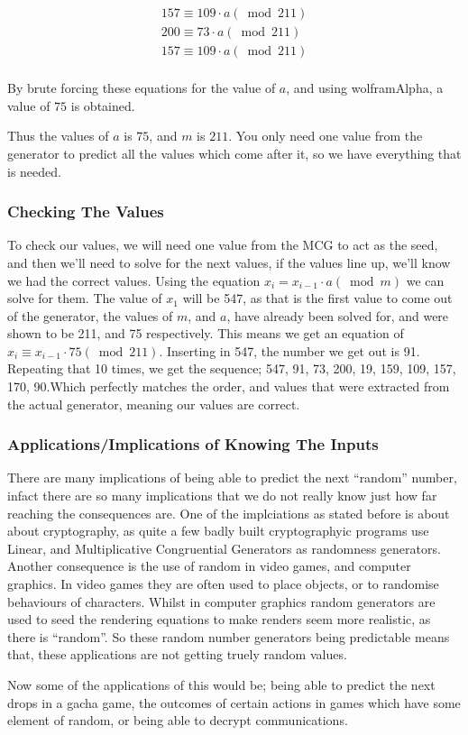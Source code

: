 \documentclass[12pft, english]{article}
\begin{document}
\begin{multicols}{2}
  \begin{gather*}
      157 \equiv 109 \cdot a (\bmod 211) \\
      200 \equiv 73 \cdot a (\bmod 211)  \\
      157 \equiv 109 \cdot a (\bmod 211) \\
    \end{gather*}

    By brute forcing these equations for the value of \(a\), and using wolframAlpha, a value of \(75\) is obtained.

    Thus the values of \(a\) is \(75\), and \(m\) is \(211\). You only need one value from the generator to predict all the values which come after it, so we have everything that is needed.

    \subsubsection{Checking The Values}
    To check our values, we will need one value from the MCG to act as the seed, and then we'll need to solve for the next values, if the values line up, we'll know we had the correct values. Using the equation \(x_{i} = x_{i-1} \cdot a (\bmod m)\) we can solve for them. The value of \(x_{1}\) will be 547, as that is the first value to come out of the generator, the values of \(m\), and \(a\), have already been solved for, and were shown to be 211, and 75 respectively. This means we get an equation of \( x_{i} \equiv x_{i-1} \cdot 75 (\bmod 211)\). Inserting in 547, the number we get out is 91. Repeating that 10 times, we get the sequence; 547, 91, 73, 200, 19, 159, 109, 157, 170, 90.Which perfectly matches the order, and values that were extracted from the actual generator, meaning our values are correct.

    \subsubsection{Applications/Implications of Knowing The Inputs}
    There are many implications of being able to predict the next ``random'' number, infact there are so many implications that we do not really know just how far reaching the consequences are. One of the implciations as stated before is about about cryptography, as quite a few badly built cryptographyic programs use Linear, and Multiplicative Congruential Generators as randomness generators. Another consequence is the use of random in video games, and computer graphics. In video games they are often used to place objects, or to randomise behaviours of characters. Whilst in computer graphics random generators are used to seed the rendering equations to make renders seem more realistic, as there is ``random''. So these random number generators being predictable means that, these applications are not getting truely random values.

    Now some of the applications of this would be; being able to predict the next drops in a gacha game, the outcomes of certain actions in games which have some element of random, or being able to decrypt communications.

\end{multicols}


\newpage



\end{document}
